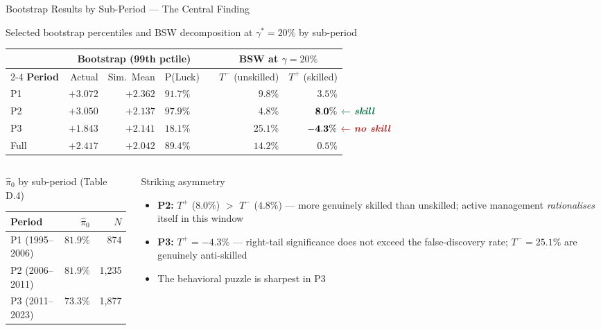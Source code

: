\documentclass[aspectratio=169,10pt]{beamer}
\newcommand{\red}[1]{\textcolor{AlertRed}{\textbf{#1}}}
\newcommand{\green}[1]{\textcolor{SkillGreen}{\textbf{#1}}}
\begin{document}
\begin{frame}{Bootstrap Results by Sub-Period — The Central Finding}
\begin{center}
{\small Selected bootstrap percentiles and BSW decomposition at $\gamma^* = 20\%$ by sub-period}
\vspace{4pt}

\setlength{\tabcolsep}{5pt}
\begin{tabular}{l rrl r rr}
\toprule
& \multicolumn{3}{c}{\textbf{Bootstrap (99th pctile)}} && \multicolumn{2}{c}{\textbf{BSW at $\gamma=20\%$}}\\
\cmidrule{2-4}\cmidrule{6-7}
\textbf{Period} & Actual & Sim.\ Mean & P(Luck) && $T^-$ (unskilled) & $T^+$ (skilled)\\
\midrule
P1 & $+3.072$ & $+2.362$ & $91.7\%$ && $9.8\%$ & $\mathbf{3.5\%}$ \\
\rowcolor{SkillGreen!12}
P2 & $+3.050$ & $+2.137$ & $\mathbf{97.9\%}$ && $4.8\%$ & $\mathbf{8.0\%}\makebox[0pt][l]{\hspace{4pt}\green{$\leftarrow$ \textit{skill}}} $\\
\rowcolor{AlertRed!10}
P3 & $+1.843$ & $+2.141$ & $18.1\%$ && $25.1\%$ & $\mathbf{-4.3\%}\makebox[0pt][l]{\hspace{4pt}\red{$\leftarrow$ \textit{no skill}}} $\\
\midrule
Full & $+2.417$ & $+2.042$ & $89.4\%$ && $14.2\%$ & $0.5\%$ \\
\bottomrule
\end{tabular}
\end{center}

\begin{columns}[T]
\begin{block}{$\hat{\pi}_0$ by sub-period (Table D.4)}
\begin{center}
\begin{tabular}{lrr}
\toprule
Period & $\hat{\pi}_0$ & $N$ \\
\midrule
P1 (1995–2006) & $81.9\%$ & 874 \\
P2 (2006–2011) & $81.9\%$ & 1,235 \\
P3 (2011–2023) & $73.3\%$ & 1,877 \\
\bottomrule
\end{tabular}
\end{center}
\end{block}

\begin{alertblock}{Striking asymmetry}
{\footnotesize
\begin{itemize}
  \item \textbf{P2:} $T^+$ ($8.0\%$) $>$ $T^-$ ($4.8\%$) — more genuinely skilled than unskilled; active management \emph{rationalises} itself in this window
  \item \textbf{P3:} $T^+ = -4.3\%$ — right-tail significance does not exceed the false-discovery rate; $T^- = 25.1\%$ are genuinely anti-skilled
  \item The behavioral puzzle is sharpest in P3
\end{itemize}}
\end{alertblock}
\end{columns}
\end{frame}
\end{document}
